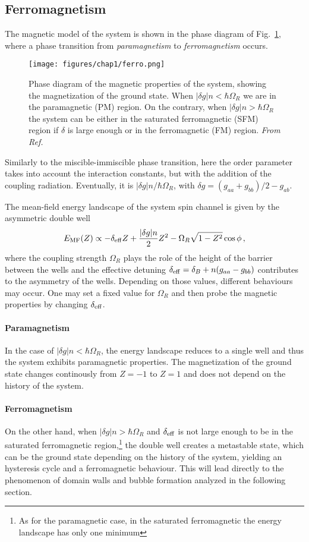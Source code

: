 \subsection{Ferromagnetism}
The magnetic model of the system is shown in the phase diagram of Fig.\ \ref{fig:ferro}, where a phase transition from \textit{paramagnetism} to \textit{ferromagnetism} occurs.
\begin{figure}[ht!]
    \centering
    \texttt{[image: figures/chap1/ferro.png]}
    \caption{Phase diagram of the magnetic properties of the system, showing the magnetization of the ground state. When $|\delta g|n < \hbar\Omega_R$ we are in the paramagnetic (PM) region. On the contrary, when $|\delta g|n > \hbar\Omega_R$ the system can be either in the saturated ferromagnetic (SFM) region if $\delta$ is large enough or in the ferromagnetic (FM) region. \textit{From Ref. \cite{cominotti2023ferro}}}
    \label{fig:ferro}
\end{figure}
Similarly to the miscible-immiscible phase transition, here the order parameter takes into account the interaction constants, but with the addition of the coupling radiation. Eventually, it is $|\delta g|n/\hbar\Omega_R$, with $\delta g = (g_{aa}+g_{bb})/2 - g_{ab}$.

The mean-field energy landscape of the system spin channel is given by the asymmetric double well
\begin{equation}
    E_{\rm MF}(Z) \propto -\delta_{\rm eff} Z + \frac{|\delta g|n}{2}Z^2 - \Omega_R \sqrt{1-Z^2}\cos\phi\, ,
    \label{eq:E_MF}
\end{equation}
where the coupling strength $\Omega_R$ plays the role of the height of the barrier between the wells and the effective detuning $\delta_{\rm eff} = \delta_B + n(g_{aa}-g_{bb})$ contributes to the asymmetry of the wells. Depending on those values, different behaviours may occur. One may set a fixed value for $\Omega_R$ and then probe the magnetic properties by changing $\delta_{\rm eff}$.

\paragraph{Paramagnetism}
In the case of $|\delta g|n < \hbar\Omega_R$, the energy landscape reduces to a single well and thus the system exhibits paramagnetic properties. The magnetization of the ground state changes continously from $Z=-1$ to $Z=1$ and does not depend on the history of the system. 

\paragraph{Ferromagnetism}
On the other hand, when $|\delta g|n > \hbar\Omega_R$ and $\delta_{\rm eff}$ is not large enough to be in the saturated ferromagnetic region,\footnote{As for the paramagnetic case, in the saturated ferromagnetic the energy landscape has only one minimum} the double well creates a metastable state, which can be the ground state depending on the history of the system, yielding an hysteresis cycle and a ferromagnetic behaviour. This will lead directly to the phenomenon of domain walls and bubble formation analyzed in the following section.


